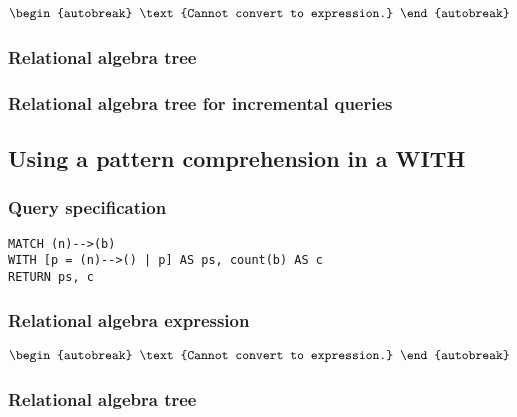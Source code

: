 \begin{align*}
\begin{autobreak}
\text{Cannot convert to expression.}
\end{autobreak}
\end{align*}

\subsubsection*{Relational algebra tree}


\subsubsection*{Relational algebra tree for incremental queries}


\subsection{Using a pattern comprehension in a WITH}

\subsubsection*{Query specification}

\begin{lstlisting}
MATCH (n)-->(b)
WITH [p = (n)-->() | p] AS ps, count(b) AS c
RETURN ps, c
\end{lstlisting}

\subsubsection*{Relational algebra expression}

\begin{align*}
\begin{autobreak}
\text{Cannot convert to expression.}
\end{autobreak}
\end{align*}

\subsubsection*{Relational algebra tree}


